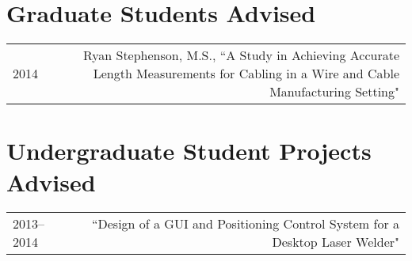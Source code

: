 \section*{Graduate Students Advised}
\begin{tabular}{L!{\VRule}R}
2014&Ryan Stephenson, M.S., ``A Study in Achieving Accurate Length Measurements for Cabling in a Wire and Cable Manufacturing Setting"\\
\end{tabular}

\section*{Undergraduate Student Projects Advised}
\begin{tabular}{L!{\VRule}R}
2013--2014&``Design of a GUI and Positioning Control System for a Desktop Laser Welder"\\
\end{tabular}